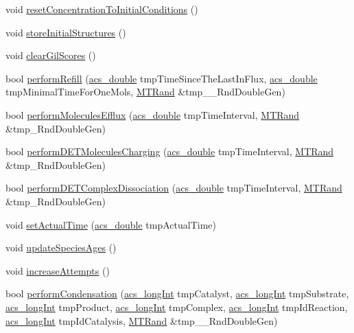 \begin{DoxyCompactItemize}
\item 
void \hyperlink{a00014_a97305e36924f19e72bfc1c3d89e45931}{reset\-Concentration\-To\-Initial\-Conditions} ()
\item 
void \hyperlink{a00014_a7fc3937fb586db93c33f7f091dc99626}{store\-Initial\-Structures} ()
\item 
void \hyperlink{a00014_aa33d7b81db9632c8ba1f9ce3f362df8e}{clear\-Gil\-Scores} ()
\item 
bool \hyperlink{a00014_a8a53821ad1675b0da50591616aac3b74}{perform\-Refill} (\hyperlink{a00050_ab776853a005fcbf56af0424a2a4dd607}{acs\-\_\-double} tmp\-Time\-Since\-The\-Last\-In\-Flux, \hyperlink{a00050_ab776853a005fcbf56af0424a2a4dd607}{acs\-\_\-double} tmp\-Minimal\-Time\-For\-One\-Mols, \hyperlink{a00016}{M\-T\-Rand} \&tmp\-\_\-\-\_\-\-Rnd\-Double\-Gen)
\item 
bool \hyperlink{a00014_acbbcdb4c77231e9ffa4c169e0caa0d0c}{perform\-Molecules\-Efflux} (\hyperlink{a00050_ab776853a005fcbf56af0424a2a4dd607}{acs\-\_\-double} tmp\-Time\-Interval, \hyperlink{a00016}{M\-T\-Rand} \&tmp\-\_\-\-Rnd\-Double\-Gen)
\item 
bool \hyperlink{a00014_adbaf165a12edd62c614a455544807ea3}{perform\-D\-E\-T\-Molecules\-Charging} (\hyperlink{a00050_ab776853a005fcbf56af0424a2a4dd607}{acs\-\_\-double} tmp\-Time\-Interval, \hyperlink{a00016}{M\-T\-Rand} \&tmp\-\_\-\-Rnd\-Double\-Gen)
\item 
bool \hyperlink{a00014_a6ae793f9d2dca0632239be955dd83cee}{perform\-D\-E\-T\-Complex\-Dissociation} (\hyperlink{a00050_ab776853a005fcbf56af0424a2a4dd607}{acs\-\_\-double} tmp\-Time\-Interval, \hyperlink{a00016}{M\-T\-Rand} \&tmp\-\_\-\-Rnd\-Double\-Gen)
\item 
void \hyperlink{a00014_a9bc445da3e89d09d4fce11c83f3dedb0}{set\-Actual\-Time} (\hyperlink{a00050_ab776853a005fcbf56af0424a2a4dd607}{acs\-\_\-double} tmp\-Actual\-Time)
\item 
void \hyperlink{a00014_adab0607255ca5927b69cb6882917e031}{update\-Species\-Ages} ()
\item 
void \hyperlink{a00014_aac3eed768b89e3a70017075b68046ede}{increase\-Attempts} ()
\item 
bool \hyperlink{a00014_a1baf5512b7e0a8fb6f8f890ba9f99cd1}{perform\-Condensation} (\hyperlink{a00050_a19319d75f02db4308bc5c0026d98cd85}{acs\-\_\-long\-Int} tmp\-Catalyst, \hyperlink{a00050_a19319d75f02db4308bc5c0026d98cd85}{acs\-\_\-long\-Int} tmp\-Substrate, \hyperlink{a00050_a19319d75f02db4308bc5c0026d98cd85}{acs\-\_\-long\-Int} tmp\-Product, \hyperlink{a00050_a19319d75f02db4308bc5c0026d98cd85}{acs\-\_\-long\-Int} tmp\-Complex, \hyperlink{a00050_a19319d75f02db4308bc5c0026d98cd85}{acs\-\_\-long\-Int} tmp\-Id\-Reaction, \hyperlink{a00050_a19319d75f02db4308bc5c0026d98cd85}{acs\-\_\-long\-Int} tmp\-Id\-Catalysis, \hyperlink{a00016}{M\-T\-Rand} \&tmp\-\_\-\-\_\-\-Rnd\-Double\-Gen)

\end{DoxyCompactItemize}

